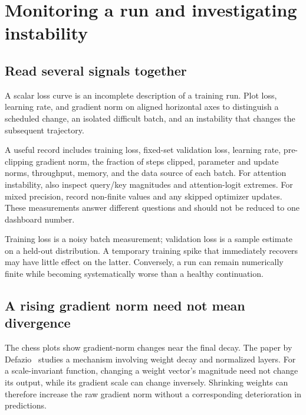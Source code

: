 \chapter{Monitoring a run and investigating instability}
\label{ch:monitoring}

\section{Read several signals together}
A scalar loss curve is an incomplete description of a training run. Plot loss, learning rate, and gradient norm on aligned horizontal axes to distinguish a scheduled change, an isolated difficult batch, and an instability that changes the subsequent trajectory.


A useful record includes training loss, fixed-set validation loss, learning rate, pre-clipping gradient norm, the fraction of steps clipped, parameter and update norms, throughput, memory, and the data source of each batch. For attention instability, also inspect query/key magnitudes and attention-logit extremes. For mixed precision, record non-finite values and any skipped optimizer updates. These measurements answer different questions and should not be reduced to one dashboard number.

Training loss is a noisy batch measurement; validation loss is a sample estimate on a held-out distribution. A temporary training spike that immediately recovers may have little effect on the latter. Conversely, a run can remain numerically finite while becoming systematically worse than a healthy continuation.

\section{A rising gradient norm need not mean divergence}
The chess plots show gradient-norm changes near the final decay. The paper by Defazio~\cite{gradtail} studies a mechanism involving weight decay and normalized layers. For a scale-invariant function, changing a weight vector's magnitude need not change its output, while its gradient scale can change inversely. Shrinking weights can therefore increase the raw gradient norm without a corresponding deterioration in predictions.

